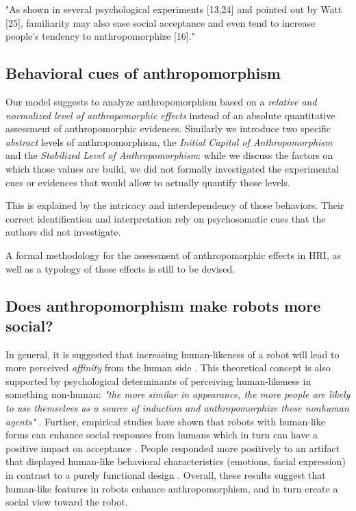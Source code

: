 \documentclass{acm_proc_article-sp}
\begin{document}
"As shown in several psychological experiments [13,24] and pointed out by Watt
[25], familiarity may also ease social acceptance and even tend to increase
people's tendency to anthropomorphize [16]." \cite{duffy_anthropomorphism_2003}


\subsection{Behavioral cues of anthropomorphism}
\label{sec:behavioralcues}

Our model suggests to analyze anthropomorphism based on a \emph{relative and
normalized level of anthropomorphic effects} instead of an absolute
quantitative assessment of anthropomorphic evidences. Similarly we introduce
two specific \emph{abstract} levels of anthropomorphism, the \emph{Initial
Capital of Anthropomorphism} and the \emph{Stabilized Level of
Anthropomorphism}: while we discuss the factors on which those values are
build, we did not formally investigated the experimental cues or evidences
that would allow to actually quantify those levels.

This is explained by the intricacy and interdependency of those behaviors.
Their correct identification and interpretation rely on psychosomatic cues that
the authors did not investigate.

A formal methodology for the assessment of anthropomorphic effects in HRI, as
well as a typology of these effects is still to be devised.

\subsection{Does anthropomorphism make robots more social?}
\label{sec:more_social}

In general, it is suggested that increasing human-likeness of a robot	 will
lead to more perceived \textit{affinity} from the human side
\cite{mori_uncanny_1970}. This theoretical concept is also supported by
psychological determinants of perceiving human-likeness in something non-human:
\textit{"the more similar in appearance, the more people are likely to use
themselves as a source of induction and anthropomorphize these nonhuman
agents"} \cite{epley_seeing_2007}. Further, empirical studies have shown that
robots with human-like forms can enhance social responses from humans which in
turn can have a positive impact on acceptance
\cite{venkatesh_theoretical_2000,duffy_anthropomorphism_2003,goetz_cooperation_2002}.
People responded more positively to an artifact that displayed human-like
behavioral characteristics (emotions, facial expression) in contrast to a
purely functional design
\cite{eyssel_anthropomorphic_2010,krach_can_2008,reeves_media_1996,riek_how_2009}.
Overall, these results suggest that human-like features in robots enhance
anthropomorphism, and in turn create a social view toward the robot.
\end{document}
